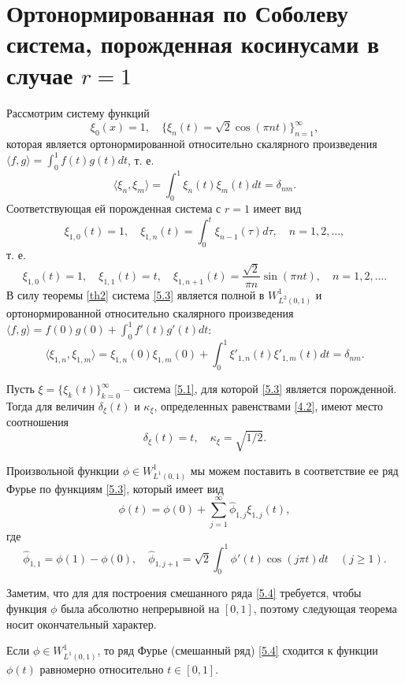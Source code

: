 \section{Ортонормированная по Соболеву  система, порожденная косинусами в случае $r=1$}
Рассмотрим систему функций
\begin{equation}\label{5.1}
\xi_0(x)=1,\quad \{\xi_n(t)=\sqrt{2}\cos(\pi nt)\}_{n=1}^\infty,
\end{equation}
которая является ортонормированной относительно скалярного произведения $\langle f,g \rangle=\int_0^1f(t)g(t)dt$, т. е.
\begin{equation}\label{5.2}
\langle\xi_n,\xi_m\rangle=\int_0^1\xi_n(t)\xi_m(t)dt=\delta_{nm}.
\end{equation}
Соответствующая ей порожденная система с $r=1$ имеет вид
$$
\xi_{1,0}(t)=1,\quad \xi_{1,n}(t)=\int_0^t \xi_{n-1}(\tau)d\tau, \quad n=1,2,\ldots,
$$
т. е.
\begin{equation}\label{5.3}
\xi_{1,0}(t)=1,\quad \xi_{1,1}(t)=t,\quad \xi_{1,n+1}(t)=\frac{\sqrt{2}}{\pi n}\sin(\pi nt),\quad n=1,2,\ldots.
\end{equation}
В силу теоремы \ref{th2} система \eqref{5.3} является полной в $W^1_{L^2(0,1)}$ и ортонормированной относительно скалярного произведения $\langle f,g\rangle=f(0)g(0)+\int_0^1 f'(t)g'(t)dt$:
\begin{equation*}
\langle\xi_{1,n},\xi_{1,m}\rangle=\xi_{1,n}(0)\xi_{1,m}(0)+\int_0^1\xi'_{1,n}(t)\xi'_{1,m}(t)dt=\delta_{nm}.
\end{equation*}

\begin{theorem}\label{th4}
	Пусть $\xi=\{\xi_k(t)\}_{k=0}^\infty$ -- система  \eqref{5.1}, для которой  \eqref{5.3} является порожденной. Тогда для величин $\delta_{\xi}(t)$ и    $\kappa_\xi$, определенных равенствами \eqref{4.2},  имеют место соотношения
	$$
	\delta_{\xi}(t)=t,\quad\kappa_{\xi}=\sqrt{1/2}.
	$$
\end{theorem}


Произвольной функции $\phi\in W^1_{L^1(0,1)}$ мы можем поставить в соответствие ее ряд Фурье по функциям \eqref{5.3}, который имеет вид
\begin{equation}\label{5.4}
\phi(t)=\phi(0)+\sum_{j=1}^\infty \hat\phi_{1,j}\xi_{1,j}(t),
\end{equation}
где
$$
\hat\phi_{1,1}=\phi(1)-\phi(0),\quad
\hat\phi_{1,j+1}=\sqrt{2}\int_{0}^{1}\phi'(t)\cos(j\pi t)dt \quad(j\ge1).
$$


Заметим, что для  для построения смешанного ряда \eqref{5.4} требуется, чтобы функция $\phi$ была абсолютно непрерывной на $[0,1]$, поэтому следующая теорема носит окончательный характер.
\begin{theorem}\label{th5}
	Если $\phi\in W^1_{L^1(0,1)}$, то ряд Фурье (смешанный ряд) \eqref{5.4} сходится к функции $\phi(t)$ равномерно относительно $t\in[0,1]$.
\end{theorem}

